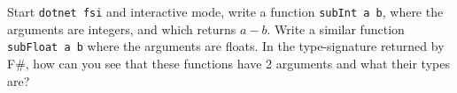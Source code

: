 Start \lstinline{dotnet fsi} and interactive mode, write a function \lstinline{subInt a b}, where the arguments are integers, and which returns $a-b$. Write a similar function \lstinline{subFloat a b} where the arguments are floats. In the type-signature returned by F\#, how can you see that these functions have 2 arguments and what their types are?